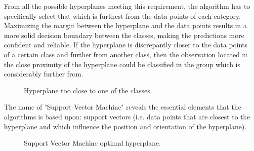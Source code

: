 From all the possible hyperplanes meeting this requirement, the algorithm has to specifically select that which is furthest from the data points of each category. Maximizing the margin between the hyperplane and the data points results in a more solid decision boundary between the classes, making the predictions more confident and reliable. If the hyperplane is discrepantly closer to the data points of a certain class and further from another class, then the observation located in the close proximity of the hyperplane could be classified in the group which is considerably further from.

\begin{figure}[h]
  \centering
  \caption{Hyperplane too close to one of the classes.}
\end{figure}

The name of "Support Vector Machine" reveals the essential elements that the algorithms is based upon: support vectors (i.e. data points that are closest to the hyperplane and which influence the position and orientation of the hyperplane).

\begin{figure}[h]
  \centering
  \caption{Support Vector Machine optimal hyperplane.}
\end{figure}
